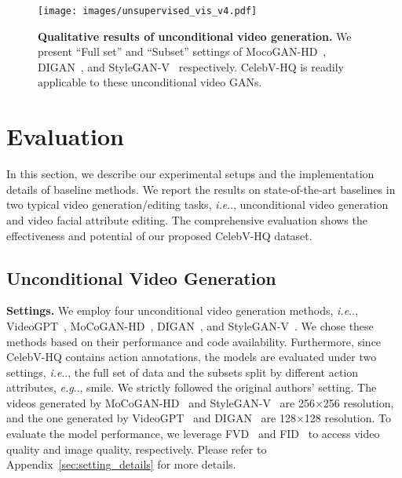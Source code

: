 \documentclass[runningheads]{llncs}
\makeatletter
\DeclareRobustCommand\onedot{\futurelet\@let@token\@onedot}
\def\@onedot{\ifx\@let@token.\else.\null\fi\xspace}
\def\eg{\emph{e.g}\onedot} \def\Eg{\emph{E.g}\onedot}
\def\ie{\emph{i.e}\onedot} \def\Ie{\emph{I.e}\onedot}
\makeatother
\begin{document}
\begin{figure*}[t]
    \centering
    \texttt{[image: images/unsupervised\_vis\_v4.pdf]}
\caption{\textbf{Qualitative results of unconditional video generation.} We present ``Full set'' and ``Subset'' settings of MocoGAN-HD~\cite{mocoganhd}, DIGAN~\cite{digan}, and StyleGAN-V~\cite{styleganv} respectively. CelebV-HQ is readily applicable to these unconditional video GANs. }
    \label{fig:unsupervised}
\end{figure*}

\section{Evaluation}
In this section, we describe our experimental setups and the implementation details of baseline methods. We report the results on state-of-the-art baselines in two typical video generation/editing tasks, \ie, unconditional video generation and video facial attribute editing. 
The comprehensive evaluation shows the effectiveness and potential of our proposed CelebV-HQ dataset.


\subsection{Unconditional Video Generation}
\begin{sloppypar}
\noindent
\textbf{Settings.} We employ four unconditional video generation methods, \ie, VideoGPT~\cite{yan2021videogpt}, MoCoGAN-HD~\cite{mocoganhd}, DIGAN~\cite{digan}, and StyleGAN-V~\cite{styleganv}. We chose these methods based on their performance and code availability.
Furthermore, since CelebV-HQ contains action annotations, the models are evaluated under two settings, \ie, the full set of data and the subsets split by different action attributes, \eg, smile. 
We strictly followed the original authors' setting. The videos generated by MoCoGAN-HD~\cite{mocoganhd} and StyleGAN-V~\cite{styleganv} are 256$\times$256 resolution, and the one generated by VideoGPT~\cite{yan2021videogpt} and DIGAN~\cite{digan} are 128$\times$128 resolution.
To evaluate the model performance, we leverage FVD~\cite{fvd} and FID~\cite{fid} to access video quality and image quality, respectively. Please refer to Appendix~\ref{sec:setting_details} for more details.
\end{sloppypar}
\end{document}
